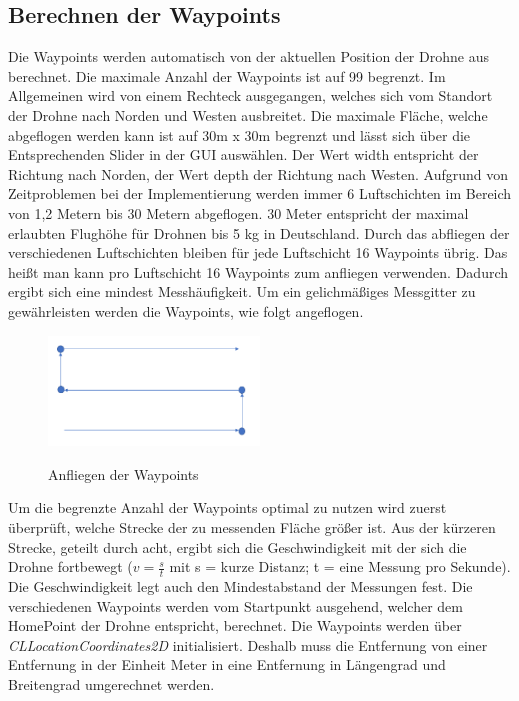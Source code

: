 \subsection{Berechnen der Waypoints}
Die Waypoints werden automatisch von der aktuellen Position der Drohne aus berechnet. Die maximale Anzahl der Waypoints ist auf 99 begrenzt. 
\newline
Im Allgemeinen wird von einem Rechteck ausgegangen, welches sich vom Standort der Drohne nach Norden und Westen ausbreitet. Die maximale Fläche, welche abgeflogen werden kann ist auf 30m x 30m begrenzt und lässt sich über die Entsprechenden Slider in der \acs{GUI} auswählen. Der Wert width entspricht der Richtung nach Norden, der Wert depth der Richtung nach Westen.
\newline
Aufgrund von Zeitproblemen bei der Implementierung werden immer 6 Luftschichten im Bereich von 1,2 Metern bis 30 Metern abgeflogen. 30 Meter entspricht der maximal erlaubten Flughöhe für Drohnen bis 5 kg in Deutschland.
\newline
Durch das abfliegen der verschiedenen Luftschichten bleiben für jede Luftschicht 16 Waypoints übrig. Das heißt man kann pro Luftschicht 16 Waypoints zum anfliegen verwenden. Dadurch ergibt sich eine mindest Messhäufigkeit. Um ein gelichmäßiges Messgitter zu gewährleisten werden die Waypoints, wie folgt angeflogen.
\newline
\begin{figure}[H]
	\begin{center}
		{\includegraphics[width=0.5\textwidth]{images/WaypointAufteilung.png}}
		\caption{Anfliegen der Waypoints}
	\end{center}
\end{figure}
Um die begrenzte Anzahl der Waypoints optimal zu nutzen wird zuerst überprüft, welche Strecke der zu messenden Fläche größer ist. Aus der kürzeren Strecke, geteilt durch acht, ergibt sich die Geschwindigkeit mit der sich die Drohne fortbewegt ($v = \frac{s}{t}$ mit s = kurze Distanz; t = eine Messung pro Sekunde). Die Geschwindigkeit legt auch den Mindestabstand der Messungen fest. 
\newline
Die verschiedenen Waypoints werden vom Startpunkt ausgehend, welcher dem HomePoint der Drohne entspricht, berechnet. Die Waypoints werden über \textit{CLLocationCoordinates2D} initialisiert. Deshalb muss die Entfernung von einer Entfernung in der Einheit Meter in eine Entfernung in Längengrad und Breitengrad umgerechnet werden. 
